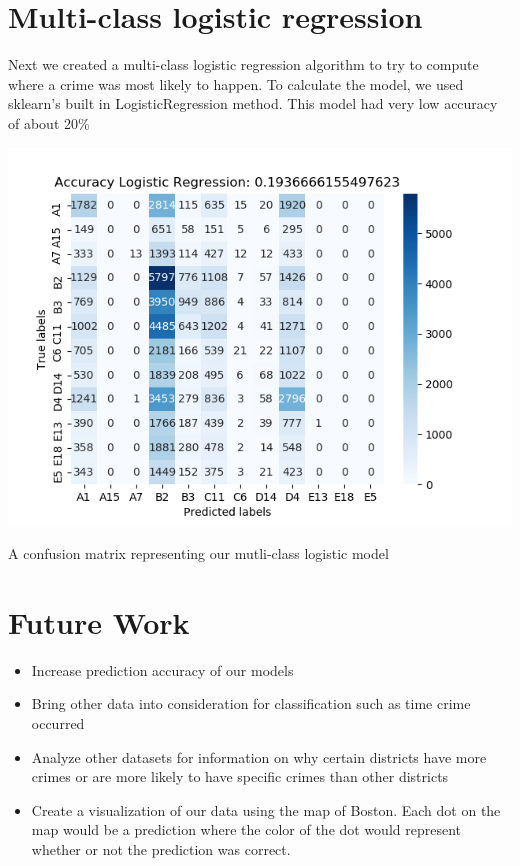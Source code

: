 \documentclass[a0,landscape]{a0poster}
\let\Section=\section
\def\section{\setcounter{equation}{0}\Section}
\newcommand{\1}{\bold{1}}
\begin{document}
\begin{multicols}{3}
\section{Multi-class logistic regression}
Next we created a multi-class logistic regression algorithm to try to compute where a crime was most likely to happen. To calculate the model, we used sklearn's built in LogisticRegression method.  This model had very low accuracy of about 20\% 
 \begin{center}
    \includegraphics[scale = 2]{lr_cm.png}
    
    A confusion matrix representing our mutli-class logistic model
   \end{center}


  

\section{Future Work}
\begin{itemize}
    \item Increase prediction accuracy of our models
    \item Bring other data into consideration for classification such as time crime occurred
    \item Analyze other datasets for information on why certain districts have more crimes or are more likely to have specific crimes than other districts 
    \item Create a visualization of our data using the map of Boston. Each dot on the map would be a prediction where the color of the dot would represent whether or not the prediction was correct.
\end{itemize}


\end{multicols}
\end{document}
